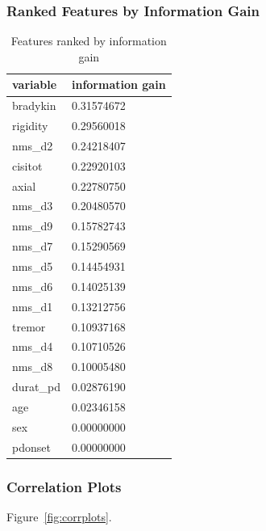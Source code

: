 \documentclass[letterpaper,12pt]{article}
\begin{document}
\subsubsection{Ranked Features by Information Gain}

\begin{table}[h]
  \centering
  \caption{Features ranked by information gain}
  \label{tab:info_gain}
  \begin{tabular}{l|l}
    variable & information gain \\
    \hline
    bradykin      & 0.31574672 \\
    rigidity      & 0.29560018 \\
    nms\_d2      & 0.24218407 \\
    cisitot      & 0.22920103 \\
    axial      & 0.22780750 \\
    nms\_d3      & 0.20480570 \\
    nms\_d9      & 0.15782743 \\
    nms\_d7      & 0.15290569 \\
    nms\_d5      & 0.14454931 \\
    nms\_d6      & 0.14025139 \\
    nms\_d1      & 0.13212756 \\
    tremor      & 0.10937168 \\
    nms\_d4      & 0.10710526 \\
    nms\_d8      & 0.10005480 \\
    durat\_pd      & 0.02876190 \\
    age      & 0.02346158 \\
    sex      & 0.00000000 \\
    pdonset      & 0.00000000 \\
  \end{tabular}
\end{table}

\subsubsection{Correlation Plots}

Figure~\ref{fig:corrplots}.
\end{document}
